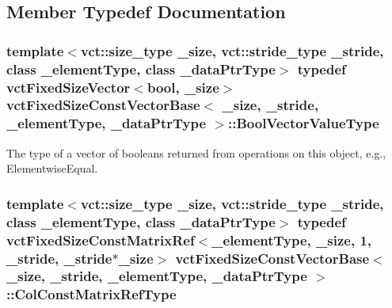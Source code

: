 \subsection{Member Typedef Documentation}
\hypertarget{classvct_fixed_size_const_vector_base_a15899465a75a2f78965bdcf2d6e34bc5}{
\subsubsection[{Bool\-Vector\-Value\-Type}]{\setlength{\rightskip}{0pt plus 5cm}template$<$vct\-::size\-\_\-type \-\_\-size, vct\-::stride\-\_\-type \-\_\-stride, class \-\_\-element\-Type, class \-\_\-data\-Ptr\-Type$>$ typedef {\bf vct\-Fixed\-Size\-Vector}$<$bool, \-\_\-size$>$ {\bf vct\-Fixed\-Size\-Const\-Vector\-Base}$<$ \-\_\-size, \-\_\-stride, \-\_\-element\-Type, \-\_\-data\-Ptr\-Type $>$\-::{\bf Bool\-Vector\-Value\-Type}}}\label{classvct_fixed_size_const_vector_base_a15899465a75a2f78965bdcf2d6e34bc5}
The type of a vector of booleans returned from operations on this object, e.\-g., Elementwise\-Equal. \hypertarget{classvct_fixed_size_const_vector_base_a7dd213f3b90969b8c89fd0766cf0a70e}{
\subsubsection[{Col\-Const\-Matrix\-Ref\-Type}]{\setlength{\rightskip}{0pt plus 5cm}template$<$vct\-::size\-\_\-type \-\_\-size, vct\-::stride\-\_\-type \-\_\-stride, class \-\_\-element\-Type, class \-\_\-data\-Ptr\-Type$>$ typedef {\bf vct\-Fixed\-Size\-Const\-Matrix\-Ref}$<$\-\_\-element\-Type, \-\_\-size, 1, \-\_\-stride, \-\_\-stride$\ast$\-\_\-size$>$ {\bf vct\-Fixed\-Size\-Const\-Vector\-Base}$<$ \-\_\-size, \-\_\-stride, \-\_\-element\-Type, \-\_\-data\-Ptr\-Type $>$\-::{\bf Col\-Const\-Matrix\-Ref\-Type}}}\label{classvct_fixed_size_const_vector_base_a7dd213f3b90969b8c89fd0766cf0a70e}
